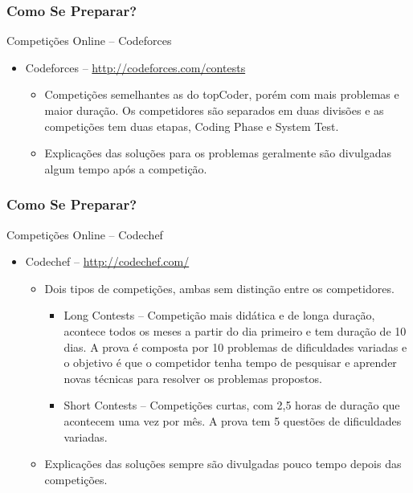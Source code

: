\begin{frame}
\frametitle{Como Se Preparar?}
\begin{block}{Competições Online -- Codeforces}
\begin{itemize}	
	\item Codeforces -- \url{http://codeforces.com/contests}
	\begin{itemize}
		\item Competições semelhantes as do topCoder, porém com mais problemas e maior duração. Os competidores são separados em duas divisões e as competições tem duas etapas, Coding Phase e System Test.
		\item Explicações das soluções para os problemas geralmente são divulgadas algum tempo após a competição.
	\end{itemize}
\end{itemize}
\end{block}
\end{frame}

\begin{frame}
\frametitle{Como Se Preparar?}
\begin{block}{Competições Online -- Codechef}
\begin{itemize}	
	\item Codechef -- \url{http://codechef.com/}
	\begin{itemize}
		\item Dois tipos de competições, ambas sem distinção entre os competidores.
		\begin{itemize}
			\item Long Contests -- Competição mais didática e de longa duração, acontece todos os meses a partir do dia primeiro e tem duração de 10 dias. A prova é composta por 10 problemas de dificuldades variadas e o objetivo é que o competidor tenha tempo de pesquisar e aprender novas técnicas para resolver os problemas propostos. 
			\item Short Contests -- Competições curtas, com 2,5 horas de duração que acontecem uma vez por mês. A prova tem 5 questões de dificuldades variadas.
		\end{itemize}
		\item Explicações das soluções sempre são divulgadas pouco tempo depois das competições.
	\end{itemize}
\end{itemize}
\end{block}
\end{frame}


